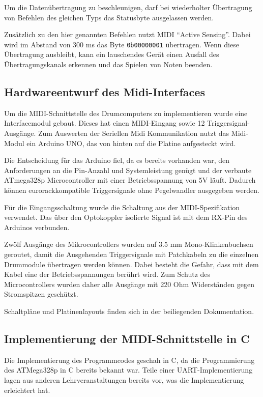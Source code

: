 Um die Datenübertragung zu beschleunigen, darf bei wiederholter Übertragung von Befehlen des gleichen Typs das Statusbyte ausgelassen werden.

Zusätzlich zu den hier genannten Befehlen nutzt MIDI \enquote{Active Sensing}.
Dabei wird im Abstand von 300 ms das Byte \texttt{0b00000001} übertragen.
Wenn diese Übertragung ausbleibt, kann ein lauschendes Gerät einen Ausfall des Übertragungskanals erkennen und das Spielen von Noten beenden.

\subsection{Hardwareentwurf des Midi-Interfaces}
\label{midi-hardwareentwurf}
Um die MIDI-Schnittstelle des Drumcomputers zu implementieren wurde eine Interfacemodul gebaut.
Dieses hat einen MIDI-Eingang sowie 12 Triggersignal-Ausgänge.
Zum Auswerten der Seriellen Midi Kommunikation nutzt das Midi-Modul ein Arduino UNO, das von hinten auf die Platine aufgesteckt wird.

Die Entscheidung für das Arduino fiel, da es bereits vorhanden war, den Anforderungen an die Pin-Anzahl und Systemleistung genügt und der verbaute ATmega328p Microcontroller mit einer Betriebsspannung von 5V läuft. Dadurch können eurorackkompatible Triggersignale ohne Pegelwandler ausgegeben werden.

Für die Eingangsschaltung wurde die Schaltung aus der MIDI-Spezifikation verwendet. Das über den Optokoppler isolierte Signal ist mit dem RX-Pin des Arduinos verbunden.

Zwölf Ausgänge des Mikrocontrollers wurden auf 3.5 mm Mono-Klinkenbuchsen geroutet, damit die Ausgehenden Triggersignale mit Patchkabeln zu die einzelnen Drummodule übertragen werden können.
Dabei besteht die Gefahr, dass mit dem Kabel eine der Betriebsspannungen berührt wird.
Zum Schutz des Microcontrollers wurden daher alle Ausgänge mit 220 Ohm Widerständen gegen Stromspitzen  geschützt.

Schaltpläne und Platinenlayouts finden sich in der beiliegenden Dokumentation.

\subsection{Implementierung der MIDI-Schnittstelle in C}
Die Implementierung des Programmcodes geschah in C, da die Programmierung des ATMega328p in C bereits bekannt war. Teile einer UART-Implementierung lagen aus anderen Lehrveranstaltungen bereits vor, was die Implementierung erleichtert hat.

